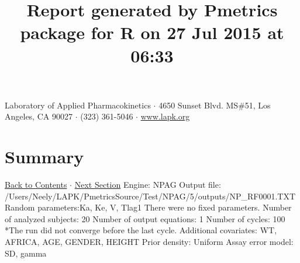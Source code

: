 \documentclass{article}
\title{Report generated by Pmetrics package for R on 27 Jul 2015 at 06:33 }
\date{}
\begin{document}
              \maketitle 
Laboratory of Applied Pharmacokinetics $\cdot$ 4650 Sunset Blvd. MS\#51, Los Angeles, CA 90027 $\cdot$ (323) 361-5046 $\cdot$ \href{http://www.lapk.org}{www.lapk.org} 
\hypertarget{tableofcontents}{}
        \tableofcontents
        \newpage 
\section{Summary} \hyperlink{tableofcontents}{Back to Contents} $\cdot$ \hyperlink{cycleinfo}{Next Section}\newline
 \newline 
Engine: NPAG\newline 
Output file: /Users/Neely/LAPK/PmetricsSource/Test/NPAG/5/outputs/NP\_RF0001.TXT\newline 
Random parameters:Ka, Ke, V, Tlag1\newline 
There were no fixed parameters. \newline 
Number of analyzed subjects:  20 \newline 
Number of output equations:  1 \newline 
Number of cycles:  100     *The run did not converge before the last cycle. \newline 
Additional covariates:  WT, AFRICA, AGE, GENDER, HEIGHT \newline 
Prior density: Uniform \newline Assay error model: SD, gamma \newline  \newline 
\newpage
            \hypertarget{cycleinfo}{}
            
\end{document}
